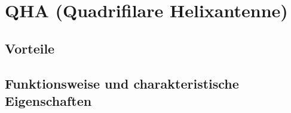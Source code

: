 \section{QHA (Quadrifilare Helixantenne)}

\subsection{Vorteile}

\subsection{Funktionsweise und charakteristische Eigenschaften}

